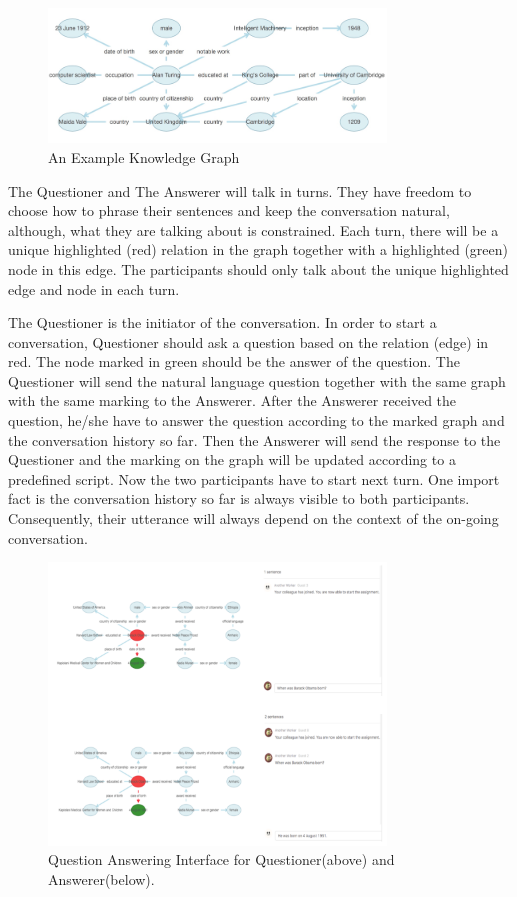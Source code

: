 \documentclass[bsc,frontabs,twoside,singlespacing,parskip,deptreport]{infthesis}     %
\begin{document}
\begin{figure}[h]
    \centering
    \includegraphics[width=0.80\textwidth]{kg.png}
    \caption{An Example Knowledge Graph}
    \label{fig:kg}
\end{figure}


The Questioner and The Answerer will talk in turns. They have freedom to choose how to phrase their sentences and keep the conversation natural, although, what they are talking about is constrained. Each turn, there will be a unique highlighted (red) relation in the graph together with a highlighted (green) node in this edge. The participants should only talk about the unique highlighted edge and node in each turn.

The Questioner is the initiator of the conversation. In order to start a conversation, Questioner should ask a question based on the relation (edge) in red. The node marked in green should be the answer of the question. The Questioner will send the natural language question together with the same graph with the same marking to the Answerer. After the Answerer received the question, he/she have to answer the question according to the marked graph and the conversation history so far. Then the Answerer will send the response to the Questioner and the marking on the graph will be updated according to a predefined script. Now the two participants have to start next turn. One import fact is the conversation history so far is always visible to both participants. Consequently, their utterance will always depend on the context of the on-going conversation.

\begin{figure}[h]
    \centering
    \includegraphics[width=0.8\textwidth]{qa1.png}
    \caption{Question Answering Interface for Questioner(above) and Answerer(below).}
    \label{fig:kgjson}
\end{figure}
\end{document}
